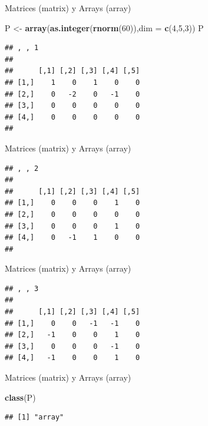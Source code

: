 \documentclass[ignorenonframetext,]{beamer}
\newenvironment{Shaded}{\begin{snugshade}}{\end{snugshade}}
\newcommand{\KeywordTok}[1]{\textcolor[rgb]{0.13,0.29,0.53}{\textbf{#1}}}
\newcommand{\DataTypeTok}[1]{\textcolor[rgb]{0.13,0.29,0.53}{#1}}
\newcommand{\DecValTok}[1]{\textcolor[rgb]{0.00,0.00,0.81}{#1}}
\newcommand{\StringTok}[1]{\textcolor[rgb]{0.31,0.60,0.02}{#1}}
\newcommand{\NormalTok}[1]{#1}
\begin{document}
\begin{frame}[fragile]{Matrices (matrix) y Arrays (array)}

\begin{Shaded}
\begin{Highlighting}[]
\NormalTok{P <-}\StringTok{ }\KeywordTok{array}\NormalTok{(}\KeywordTok{as.integer}\NormalTok{(}\KeywordTok{rnorm}\NormalTok{(}\DecValTok{60}\NormalTok{)),}\DataTypeTok{dim =} \KeywordTok{c}\NormalTok{(}\DecValTok{4}\NormalTok{,}\DecValTok{5}\NormalTok{,}\DecValTok{3}\NormalTok{))}
\NormalTok{P}
\end{Highlighting}
\end{Shaded}

\begin{verbatim}
## , , 1
## 
##      [,1] [,2] [,3] [,4] [,5]
## [1,]    1    0    1    0    0
## [2,]    0   -2    0   -1    0
## [3,]    0    0    0    0    0
## [4,]    0    0    0    0    0
## 
\end{verbatim}

\end{frame}

\begin{frame}[fragile]{Matrices (matrix) y Arrays (array)}

\begin{verbatim}
## , , 2
## 
##      [,1] [,2] [,3] [,4] [,5]
## [1,]    0    0    0    1    0
## [2,]    0    0    0    0    0
## [3,]    0    0    0    1    0
## [4,]    0   -1    1    0    0
## 
\end{verbatim}

\end{frame}

\begin{frame}[fragile]{Matrices (matrix) y Arrays (array)}

\begin{verbatim}
## , , 3
## 
##      [,1] [,2] [,3] [,4] [,5]
## [1,]    0    0   -1   -1    0
## [2,]   -1    0    0    1    0
## [3,]    0    0    0   -1    0
## [4,]   -1    0    0    1    0
\end{verbatim}

\end{frame}

\begin{frame}[fragile]{Matrices (matrix) y Arrays (array)}

\begin{Shaded}
\begin{Highlighting}[]
\KeywordTok{class}\NormalTok{(P)}
\end{Highlighting}
\end{Shaded}

\begin{verbatim}
## [1] "array"
\end{verbatim}

\end{frame}
\end{document}
